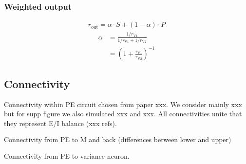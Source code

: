 \documentclass[10pt,a4paper,draft]{article}
\begin{document}
\subsubsection*{Weighted output}
%
\begin{align}
r_\mathrm{out} = \alpha \cdot S + (1-\alpha) \cdot P
\end{align}
%
\begin{align}
\alpha &= \frac{1/r_\mathrm{V1}}{1/r_\mathrm{V1} + 1/r_\mathrm{V2}}\nonumber\\
& = \left( 1 + \frac{r_\mathrm{V1}}{r_\mathrm{V2}} \right)^{-1}
\end{align}

\subsection*{Connectivity}
%
Connectivity within PE circuit chosen from paper xxx. We consider mainly xxx but for supp figure we also simulated xxx and xxx. All connectivities unite that they represent E/I balance (xxx refs). 

Connectivity from PE to M and back (differences between lower and upper)

Connectivity from PE to variance neuron.
\end{document}
